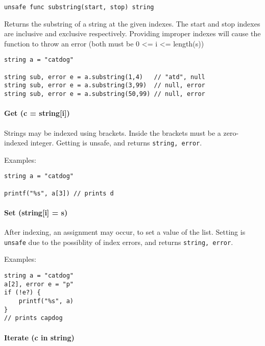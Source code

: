 \begin{verbatim}
unsafe func substring(start, stop) string
\end{verbatim}

Returns the substring of a string at the given indexes. The start and
stop indexes are inclusive and exclusive respectively. Providing
improper indexes will cause the function to throw an error (both must be
0 \textless{}= i \textless{}= length(s))

\begin{verbatim}
string a = "catdog"

string sub, error e = a.substring(1,4)   // "atd", null
string sub, error e = a.substring(3,99)  // null, error
string sub, error e = a.substring(50,99) // null, error
\end{verbatim}

\paragraph{Get (c = string{[}i{]})}\label{get-c-stringi}

Strings may be indexed using brackets. Inside the brackets must be a
zero-indexed integer. Getting is unsafe, and returns
\texttt{string, error}.

Examples:

\begin{verbatim}
string a = "catdog"

printf("%s", a[3]) // prints d
\end{verbatim}

\paragraph{Set (string{[}i{]} = s)}\label{set-stringi-s}

After indexing, an assignment may occur, to set a value of the list.
Setting is \texttt{unsafe} due to the possiblity of index errors, and
returns \texttt{string, error}.

Examples:

\begin{verbatim}
string a = "catdog"
a[2], error e = "p"
if (!e?) {
    printf("%s", a)
}
// prints capdog
\end{verbatim}

\paragraph{Iterate (c in string)}\label{iterate-c-in-string}

